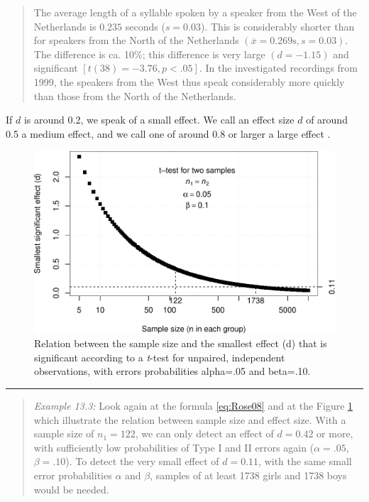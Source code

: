 \documentclass[
]{book}
\begin{document}
\begin{quote}
The average length of a syllable spoken by a speaker from
the West of the Netherlands is \(0.235\) seconds (\(s=0.03\)). This is
considerably shorter than for speakers from the North of the Netherlands
\((\overline{x}=0.269 \textrm{s}, s=0.03)\). The difference is ca. 10\%; this
difference is very large \((d=-1.15)\) and significant
\([t(38)=-3.76, p<.05]\). In the investigated recordings from 1999, the
speakers from the West thus speak considerably more quickly than those from
the North of the Netherlands.
\end{quote}

If \(d\) is around 0.2, we speak of a small effect. We call an effect size
\(d\) of around 0.5 a medium effect, and we call one
of around 0.8 or larger a large effect \citep{Cohen88, Rose08}.

\begin{figure}
\centering
\includegraphics{QMS-EN_files/figure-latex/smallestsignifdifference-1.pdf}
\caption{\label{fig:smallestsignifdifference}Relation between the sample size and the smallest effect (d) that is significant according to a \emph{t}-test for unpaired, independent observations, with errors probabilities alpha=.05 and beta=.10.}
\end{figure}

\begin{center}\rule{0.5\linewidth}{0.5pt}\end{center}

\begin{quote}
\emph{Example 13.3:}
Look again at the formula \eqref{eq:Rose08}
and at the Figure \ref{fig:smallestsignifdifference} which illustrate
the relation between sample size and effect size. With a sample size
of \(n_1=122\), we can only detect an effect of \(d=0.42\)
or more, with sufficiently low probabilities of Type I and II errors again
(\(\alpha=.05\), \(\beta=.10\)). To detect the very small effect of \(d=0.11\),
with the same small error probabilities \(\alpha\) and \(\beta\), samples
of at least 1738 girls and 1738 boys would be needed.
\end{quote}
\end{document}
